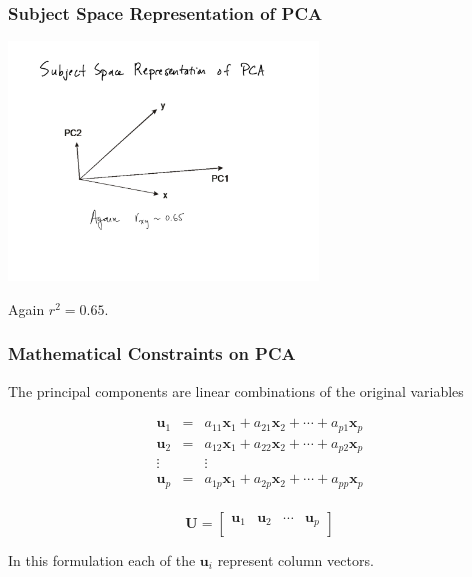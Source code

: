 \documentclass{beamer}
\newcommand{\Mtx}[1]{\ensuremath{\mathbf{#1}}}
\begin{document}
\begin{frame}
  \frametitle{Subject Space Representation of PCA}

\begin{center}
\includegraphics[height=2.5in]{pca-subject-space}
\smallskip

Again $r^2 = 0.65$.

\end{center}  

\end{frame}


\begin{frame}
  \frametitle{Mathematical Constraints on PCA}

The principal components are linear combinations of the original variables
\medskip

\[ \begin{array}{ccc}
\Mtx{u}_1 & = & a_{11}\Mtx{x}_1 + a_{21}\Mtx{x}_2 + \cdots + a_{p1}\Mtx{x}_p \\
\Mtx{u}_2 & = & a_{12}\Mtx{x}_1 + a_{22}\Mtx{x}_2 + \cdots + a_{p2}\Mtx{x}_p \\
\vdots & & \vdots \\
\Mtx{u}_p & = & a_{1p}\Mtx{x}_1 + a_{2p}\Mtx{x}_2 + \cdots + a_{pp}\Mtx{x}_p \\
\end{array}
\]

\bigskip

\[
\Mtx{U}  =  \left[ \begin{array}{cccc}
\Mtx{u}_1 & \Mtx{u}_2 & \cdots &  \Mtx{u}_p\\
\end{array} \right]
\]

In this formulation each of the $\Mtx{u}_i$ represent column vectors.


\end{frame}
\end{document}
